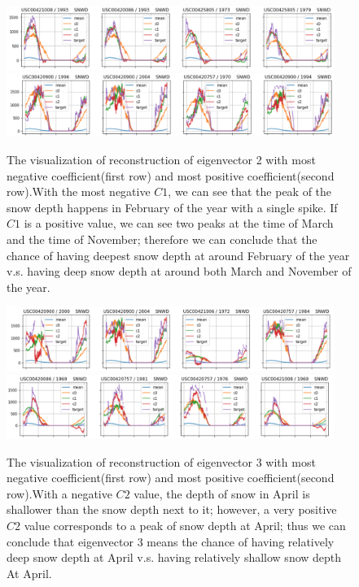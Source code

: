 \documentclass[a4paper]{article}
\begin{document}
\begin{figure}[!htp]
\vspace{-2cm}
\begin{center}

\includegraphics[width=0.95\textwidth]{coef2_neg.png}
\includegraphics[width=0.95\textwidth]{coef2_pos.png}
\caption{\label{fig:coef2} The visualization of reconstruction of eigenvector 2 with most negative coefficient(first row) and most positive coefficient(second row).With the most negative $C1$, we can see that the peak of the snow depth happens in February of the year with a single spike. If $C1$ is a positive value, we can see two peaks at the time of March and the time of November; therefore we can conclude that the chance of having deepest snow depth at around February of the year v.s. having deep snow depth at around both March and November of the year.}

\vspace{2cm}
\includegraphics[width=0.95\textwidth]{coef3_neg.png}
\includegraphics[width=0.95\textwidth]{coef3_pos.png}
\caption{\label{fig:coef3} The visualization of reconstruction of eigenvector 3 with most negative coefficient(first row) and most positive coefficient(second row).With a negative $C2$ value, the depth of snow in April is shallower than the snow depth next to it; however, a very positive $C2$ value corresponds to a peak of snow depth at April; thus we can conclude that eigenvector 3 means the chance of having relatively deep snow depth at April v.s.  having relatively shallow snow depth At April.}

\end{center}
\vspace{-1cm}
\end{figure}
\end{document}
